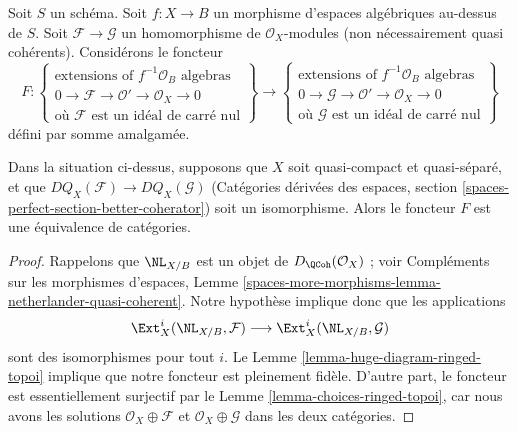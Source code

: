 \noindent
Soit $S$ un schéma. Soit $f : X \to B$ un morphisme d'espaces algébriques
au-dessus de $S$.
Soit $\mathcal{F} \to \mathcal{G}$ un homomorphisme de
$\mathcal{O}_X$-modules (non nécessairement quasi cohérents).
Considérons le foncteur
$$
F :
\left\{
\begin{matrix}
\text{extensions of }f^{-1}\mathcal{O}_B\text{ algebras}\\
0 \to \mathcal{F} \to \mathcal{O}' \to \mathcal{O}_X \to 0\\
\text{où }\mathcal{F}\text{ est un idéal de carré nul}
\end{matrix}
\right\}
\longrightarrow
\left\{
\begin{matrix}
\text{extensions of }f^{-1}\mathcal{O}_B\text{ algebras}\\
0 \to \mathcal{G} \to \mathcal{O}' \to \mathcal{O}_X \to 0\\
\text{où }\mathcal{G}\text{ est un idéal de carré nul}
\end{matrix}
\right\}
$$
défini par somme amalgamée.

\begin{lemma}
\label{lemma-thickening-space-quasi-coherent}
Dans la situation ci-dessus, supposons que $X$ soit quasi-compact et
quasi-séparé, et que $DQ_X(\mathcal{F}) \to DQ_X(\mathcal{G})$
(Catégories dérivées des espaces, section
\ref{spaces-perfect-section-better-coherator}) soit un isomorphisme.
Alors le foncteur $F$ est une équivalence de catégories.
\end{lemma}

\begin{proof}
Rappelons que $\NL_{X/B}$ est un objet de $D_\QCoh(\mathcal{O}_X)$ ; voir
Compléments sur les morphismes d'espaces, Lemme
\ref{spaces-more-morphisms-lemma-netherlander-quasi-coherent}.
Notre hypothèse implique donc que les applications
$$
\Ext^i_X(\NL_{X/B}, \mathcal{F}) \longrightarrow
\Ext^i_X(\NL_{X/B}, \mathcal{G})
$$
sont des isomorphismes pour tout $i$. Le
Lemme \ref{lemma-huge-diagram-ringed-topoi} implique que notre foncteur est
pleinement fidèle. D'autre part, le foncteur est essentiellement surjectif par
le Lemme \ref{lemma-choices-ringed-topoi}, car nous avons les solutions
$\mathcal{O}_X \oplus \mathcal{F}$ et $\mathcal{O}_X \oplus \mathcal{G}$ dans
les deux catégories.
\end{proof}


